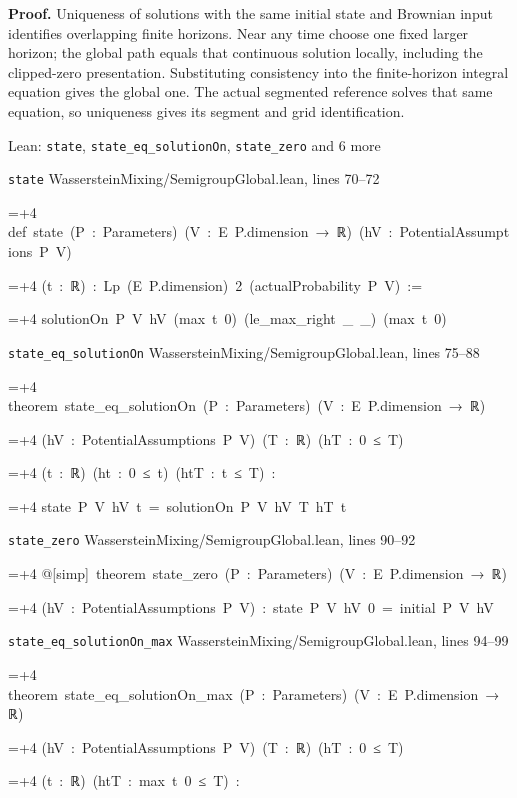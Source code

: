 \documentclass[11pt,a4paper]{article}
\newlength{\leancharwidth}
\newenvironment{leancode}{\par\smallskip\begingroup\ttfamily\footnotesize\raggedright
  \settowidth{\leancharwidth}{M}\setlength{\parskip}{0pt}\setlength{\parindent}{0pt}
  \frenchspacing}{\par\endgroup\smallskip}
\newcommand{\leanline}[2]{\hangindent=\dimexpr#1\leancharwidth+4\leancharwidth\relax
  \hangafter=1\noindent\hspace*{#1\leancharwidth}#2\par}
\newcommand{\leansource}[1]{\par{\footnotesize\color{leanmuted}#1}\par}
\begin{document}
\textbf{Proof.} Uniqueness of solutions with the same initial state and Brownian input identifies overlapping finite horizons. Near any time choose one fixed larger horizon; the global path equals that continuous solution locally, including the clipped-zero presentation. Substituting consistency into the finite-horizon integral equation gives the global one. The actual segmented reference solves that same equation, so uniqueness gives its segment and grid identification.

\begin{leanbox}{Lean: \texttt{state}, \texttt{state\_\allowbreak{}eq\_\allowbreak{}solutionOn}, \texttt{state\_\allowbreak{}zero} and 6 more}
\leansource{\texttt{state} \quad WassersteinMixing/\allowbreak{}SemigroupGlobal.lean, lines 70–72}
\begin{leancode}
\leanline{0}{def\ state\ (P\ :\ Parameters)\ (V\ :\ E\ P.dimension\ →\ ℝ)\ (hV\ :\ PotentialAssumptions\ P\ V)}
\leanline{4}{(t\ :\ ℝ)\ :\ Lp\ (E\ P.dimension)\ 2\ (actualProbability\ P\ V)\ :=}
\leanline{2}{solutionOn\ P\ V\ hV\ (max\ t\ 0)\ (le\_max\_right\ \_\ \_)\ (max\ t\ 0)}
\end{leancode}
\leansource{\texttt{state\_\allowbreak{}eq\_\allowbreak{}solutionOn} \quad WassersteinMixing/\allowbreak{}SemigroupGlobal.lean, lines 75–88}
\begin{leancode}
\leanline{0}{theorem\ state\_eq\_solutionOn\ (P\ :\ Parameters)\ (V\ :\ E\ P.dimension\ →\ ℝ)}
\leanline{4}{(hV\ :\ PotentialAssumptions\ P\ V)\ (T\ :\ ℝ)\ (hT\ :\ 0\ ≤\ T)}
\leanline{4}{(t\ :\ ℝ)\ (ht\ :\ 0\ ≤\ t)\ (htT\ :\ t\ ≤\ T)\ :}
\leanline{4}{state\ P\ V\ hV\ t\ =\ solutionOn\ P\ V\ hV\ T\ hT\ t}
\end{leancode}
\leansource{\texttt{state\_\allowbreak{}zero} \quad WassersteinMixing/\allowbreak{}SemigroupGlobal.lean, lines 90–92}
\begin{leancode}
\leanline{0}{@[simp]\ theorem\ state\_zero\ (P\ :\ Parameters)\ (V\ :\ E\ P.dimension\ →\ ℝ)}
\leanline{4}{(hV\ :\ PotentialAssumptions\ P\ V)\ :\ state\ P\ V\ hV\ 0\ =\ initial\ P\ V\ hV}
\end{leancode}
\leansource{\texttt{state\_\allowbreak{}eq\_\allowbreak{}solutionOn\_\allowbreak{}max} \quad WassersteinMixing/\allowbreak{}SemigroupGlobal.lean, lines 94–99}
\begin{leancode}
\leanline{0}{theorem\ state\_eq\_solutionOn\_max\ (P\ :\ Parameters)\ (V\ :\ E\ P.dimension\ →\ ℝ)}
\leanline{4}{(hV\ :\ PotentialAssumptions\ P\ V)\ (T\ :\ ℝ)\ (hT\ :\ 0\ ≤\ T)}
\leanline{4}{(t\ :\ ℝ)\ (htT\ :\ max\ t\ 0\ ≤\ T)\ :}

\end{leancode}
\end{leanbox}
\end{document}
